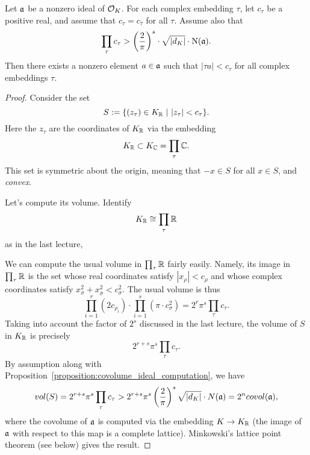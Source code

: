 \begin{theorem}
  Let $\mathfrak{a}$ be a nonzero ideal of $\mathcal{O}_{K}$.
  For each complex embedding $\tau$, let $c_{\tau}$ be a positive real, and assume that $c_{\tau} = c_{\bar\tau}$ for all $\tau$.
  Assume also that
  \[ \prod_{\tau} c_{\tau} > \left(\frac{2}{\pi}\right)^{s} \cdot \sqrt{|d_{K}|} \cdot \operatorname{N}(\mathfrak{a}). \]
  Then there exists a nonzero element $a \in \mathfrak{a}$ such that $|\tau a|<c_{\tau}$ for all complex embeddings $\tau$.
\end{theorem}
\begin{proof}
  Consider the set
  \[ S := \{(z_{\tau}) \in K_{\mathbb{R}} \ | \ |z_{\tau}| < c_{\tau} \}. \]
  Here the $z_{\tau}$ are the coordinates of $K_{\mathbb{R}}$ via the embedding
  \[ K_{\mathbb{R}} \subset K_{\mathbb{C}} = \prod_{\tau} \mathbb{C}. \]
  This set is symmetric about the origin, meaning that $-x \in S$ for all $x \in S$, and \emph{convex}.

  Let's compute its volume.
  Identify
  \[ K_{\mathbb{R}} \cong \prod_{\tau} \mathbb{R} \]
  as in the last lecture, 

  We can compute the usual volume in $\prod_{\tau}\mathbb{R}$ fairly easily.
  Namely, its image in $\prod_{\tau} \mathbb{R}$ is the set whose real coordinates satisfy $|x_{\rho}| < c_{\rho}$ and whose complex coordinates satisfy $x_{\sigma}^{2} + x_{\bar\sigma}^{2} < c_{\sigma}^{2}$.
  The usual volume is thus
  \[ \prod_{i = 1}^{r} (2 c_{\rho_{i}}) \cdot \prod_{i = 1}^{s} (\pi \cdot c_{\sigma}^{2}) = 2^{r} \pi^{s} \prod_{\tau} c_{\tau}. \]
  Taking into account the factor of $2^{s}$ discussed in the last lecture, the volume of $S$ in $K_{\mathbb{R}}$ is precisely
  \[ 2^{r+s} \pi^{s} \prod_{\tau} c_{\tau}. \]
  By assumption along with Proposition~\ref{proposition:covolume_ideal_computation}, we have
  \[ vol(S) = 2^{r+s} \pi^{s} \prod_{\tau} c_{\tau} > 2^{r+s} \pi^{s} \left( \frac{2}{\pi} \right)^{s} \sqrt{|d_{K}|} \cdot N(\mathfrak{a}) = 2^{n} covol(\mathfrak{a}), \]
  where the covolume of $\mathfrak{a}$ is computed via the embedding $K \to K_{\mathbb{R}}$ (the image of $\mathfrak{a}$ with respect to this map is a complete lattice).
  Minkowski's lattice point theorem (see below) gives the result.
\end{proof}

